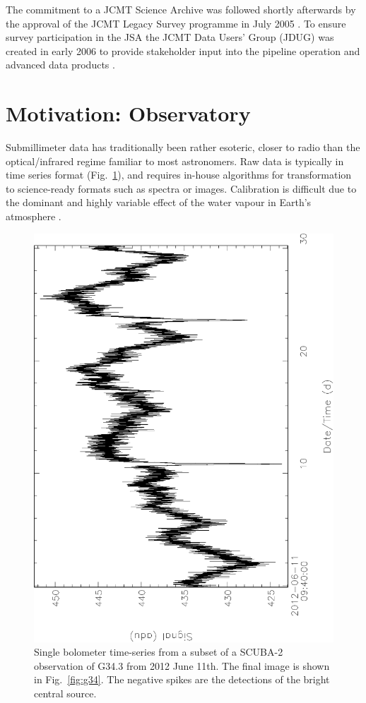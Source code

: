 \documentclass[final,authoryear,5p,times,twocolumn]{elsarticle}
\newcommand*\figref[1]{Fig.~\ref{#1}}
\begin{document}
The commitment to a JCMT Science Archive was followed shortly
afterwards by the approval of the JCMT Legacy Survey programme in July
2005 \citep{2005JCMTN23}. To ensure survey participation in the JSA
the JCMT Data Users' Group (JDUG) was created in early 2006 to provide
stakeholder input into the pipeline operation and advanced data
products \citep{2006JCMTN24R}.

\section{Motivation: Observatory}

Submillimeter data has traditionally been rather esoteric, closer to
radio than the optical/infrared regime familiar to most
astronomers. Raw data is typically in time series format (\figref{fig:g34ts}), and requires
in-house algorithms for transformation to science-ready formats such
as spectra or images. Calibration is
difficult due to the dominant and highly variable effect of the water
vapour in Earth's atmosphere
\citep[e.g.,][]{2002MNRAS.336....1A,2013MNRAS.430.2534D}.

\begin{figure}[t]
\includegraphics[angle=-90,width=\columnwidth]{g34ts}
\caption{Single bolometer time-series from a subset of a SCUBA-2
  observation of G34.3 from 2012 June 11th. The final image is shown in
  \figref{fig:g34}. The negative spikes are the detections of the
  bright central source.}
\label{fig:g34ts}
\end{figure}
\end{document}
